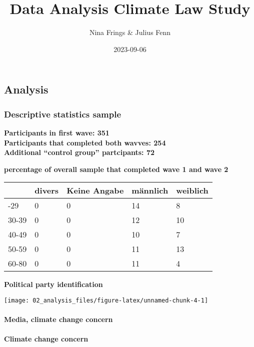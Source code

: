 \documentclass[
]{article}
\title{Data Analysis Climate Law Study}
\author{Nina Frings \& Julius Fenn}
\date{2023-09-06}
\begin{document}
\maketitle

{
\setcounter{tocdepth}{3}
\tableofcontents
}
\hypertarget{analysis}{%
\subsection{Analysis}\label{analysis}}

\hypertarget{descriptive-statistics-sample}{%
\subsubsection{Descriptive statistics
sample}\label{descriptive-statistics-sample}}

\textbf{Participants in first wave: 351}\\
\textbf{Participants that completed both wavves: 254}\\
\textbf{Additional ``control group'' partcipants: 72}

\textbf{percentage of overall sample that completed wave 1 and wave 2}

\begin{longtable}[]{@{}lllll@{}}
\toprule\noalign{}
& divers & Keine Angabe & männlich & weiblich \\
\midrule\noalign{}
\endhead
\bottomrule\noalign{}
\endlastfoot
18-29 & 0 & 0 & 14 & 8 \\
30-39 & 0 & 0 & 12 & 10 \\
40-49 & 0 & 0 & 10 & 7 \\
50-59 & 0 & 0 & 11 & 13 \\
60-80 & 0 & 0 & 11 & 4 \\
\end{longtable}

\textbf{Political party identification}

\begin{center}\texttt{[image: 02\_analysis\_files/figure-latex/unnamed-chunk-4-1]} \end{center}

\hypertarget{media-climate-change-concern}{%
\paragraph{Media, climate change
concern}\label{media-climate-change-concern}}

\hypertarget{climate-change-concern}{%
\paragraph{Climate change concern}\label{climate-change-concern}}
\end{document}
